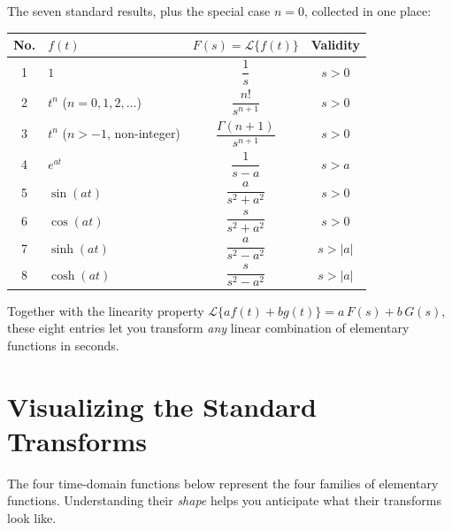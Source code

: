 \documentclass[12pt,a4paper]{article}
\begin{document}
The seven standard results, plus the special case $n=0$, collected in one place:

\begin{center}
\begin{tabular}{@{}clcc@{}}
\toprule
\textbf{No.} & \textbf{$f(t)$} & \textbf{$F(s) = \mathcal{L}\{f(t)\}$} & \textbf{Validity} \\
\midrule
1 & $1$ & $\dfrac{1}{s}$ & $s > 0$ \\[8pt]
2 & $t^n$ ($n = 0,1,2,\ldots$) & $\dfrac{n!}{s^{n+1}}$ & $s > 0$ \\[8pt]
3 & $t^n$ ($n > -1$, non-integer) & $\dfrac{\Gamma(n+1)}{s^{n+1}}$ & $s > 0$ \\[8pt]
4 & $e^{at}$ & $\dfrac{1}{s - a}$ & $s > a$ \\[8pt]
5 & $\sin(at)$ & $\dfrac{a}{s^2 + a^2}$ & $s > 0$ \\[8pt]
6 & $\cos(at)$ & $\dfrac{s}{s^2 + a^2}$ & $s > 0$ \\[8pt]
7 & $\sinh(at)$ & $\dfrac{a}{s^2 - a^2}$ & $s > |a|$ \\[8pt]
8 & $\cosh(at)$ & $\dfrac{s}{s^2 - a^2}$ & $s > |a|$ \\
\bottomrule
\end{tabular}
\end{center}

Together with the linearity property
$\mathcal{L}\{af(t)+bg(t)\} = a\,F(s)+b\,G(s)$,
these eight entries let you transform \emph{any} linear combination of elementary functions
in seconds.

\section{Visualizing the Standard Transforms}

The four time-domain functions below represent the four families of elementary functions.
Understanding their \emph{shape} helps you anticipate what their transforms look like.
\end{document}

